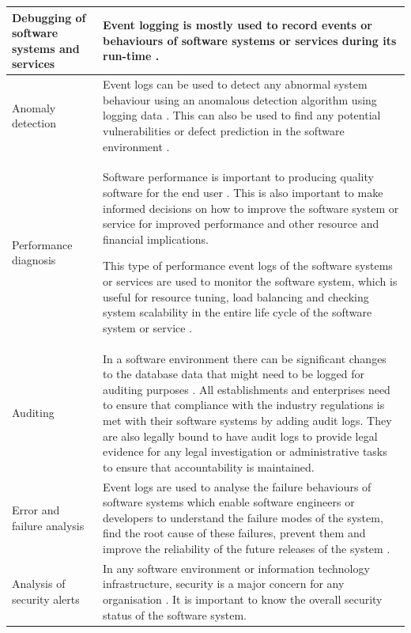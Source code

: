 \begin{xltabular}{\textwidth}{|l|X|}
		\hline Debugging of software systems and services & Event logging is mostly used to record events or behaviours of software systems or services during its run-time \cite{Rong2018a}.\\
		\hline Anomaly detection & Event logs can be used to detect any abnormal system behaviour using an anomalous detection algorithm using logging data \cite{Gurumdimma2016}. This can also be used to find any potential vulnerabilities or defect prediction in the software environment \cite{Dwyer2013}. \\
		\hline Performance diagnosis & Software performance is important to producing quality software for the end user \cite{EvangelinGeetha2007, Baccanico2014}. This is also important to make informed decisions on how to improve the software system or service for improved performance and other resource and financial implications.\par This type of performance event logs of the software systems or services are used to monitor the software system, which is useful for resource tuning, load balancing and checking system scalability in the entire life cycle of the software system or service \cite{Song2017}. \\ 
		\hline Auditing & In a software environment there can be significant changes to the database data that might need to be logged for auditing purposes \cite{Rong2018a}. All establishments and enterprises need to ensure that compliance with the industry regulations is met with their software systems by adding audit logs. They are also legally bound to have audit logs to provide legal evidence for any legal investigation or administrative tasks to ensure that accountability is maintained. \\
		\hline Error and failure analysis & Event logs are used to analyse the failure behaviours of software systems which enable software engineers or developers to understand the failure modes of the system, find the root cause of these failures, prevent them and improve the reliability of the future releases of the system \cite{Cinque2013}.\\
		\hline Analysis of security alerts & In any software environment or information technology infrastructure, security is a major concern for any organisation \cite{Pathan2014, Dwyer2013}. It is important to know the overall security status of the software system. \\
\end{xltabular}

